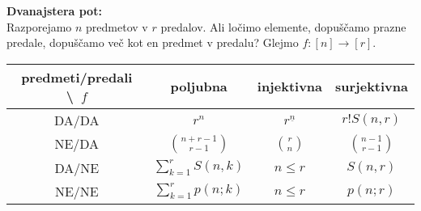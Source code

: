 \documentclass[a4paper, oneside, 10pt]{article}
\theoremstyle{definition}
\begin{document}
\textbf{Dvanajstera pot:}\\
Razporejamo $n$ predmetov v $r$ predalov. Ali ločimo elemente,
dopuščamo prazne predale, dopuščamo več kot en predmet v predalu?  Glejmo
$f\colon[n] \to [r]$.

\begin{tabular}{|c|c|c|c|}
  \hline
  predmeti/predali \textbackslash\ $f$ & poljubna & injektivna & surjektivna \\ \hline
  DA/DA & $r^n$ & $r^{\underline{n}}$ & $r!S(n, r)$ \\ \hline
  NE/DA & $\binom{n+r-1}{r-1}$ & $\binom{r}{n}$ & $\binom{n-1}{r-1}$ \\ \hline
  DA/NE & $\sum_{k=1}^rS(n, k)$ & $n \leq r$ & $S(n, r)$ \\ \hline
  NE/NE & $\sum_{k=1}^rp(n; k)$ & $n \leq r$ & $p(n; r)$ \\ \hline
\end{tabular}
\end{document}
